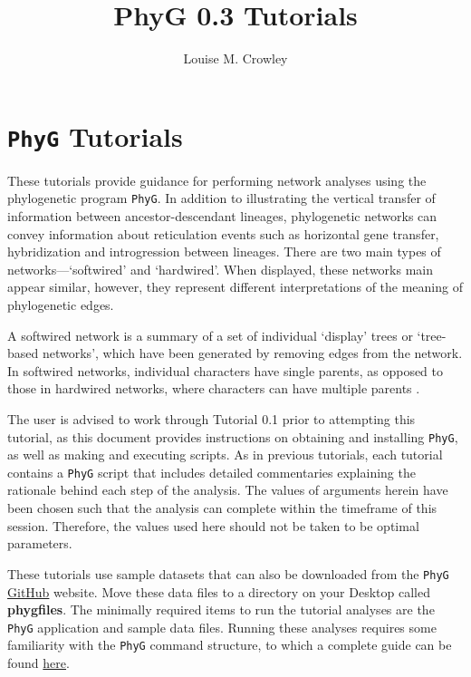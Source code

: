 \documentclass[11pt]{article}
\title{PhyG 0.3 Tutorials}
\author{Louise M. Crowley}
\newcommand{\phyg}{\texttt{PhyG} }
\begin{document}
\maketitle

\section{\phyg Tutorials}

These tutorials provide guidance for performing network analyses using the 
phylogenetic program \texttt{PhyG}. In addition to illustrating the vertical transfer 
of information between ancestor-descendant lineages, phylogenetic networks 
can convey information about reticulation events such as horizontal gene transfer, 
hybridization and introgression between lineages. There are two main types of 
networks---`softwired' and `hardwired'. When displayed, these networks main 
appear similar, however, they represent different interpretations of the meaning 
of phylogenetic edges.

A softwired network is a summary of a set of individual `display' trees or `tree-based 
networks', which have been generated by removing edges from the network.
In softwired networks, individual characters have single parents, as opposed 
to those in hardwired networks, where characters can have multiple parents 
\citep{KannanandWheeler2012}.

The user is advised to work through Tutorial 0.1 prior to attempting this tutorial, 
as this document provides instructions on obtaining and installing \texttt{PhyG}, 
as well as making and executing scripts. As in previous tutorials, each tutorial 
contains a \phyg script that includes detailed commentaries explaining the 
rationale behind each step of the analysis. The values of arguments herein have 
been chosen such that the analysis can complete within the timeframe of this 
session. Therefore, the values used here should not be taken to be optimal 
parameters. 

These tutorials use sample datasets that can also be downloaded from the 
\texttt{PhyG} \href{https://github.com/amnh/PhyGraph}{GitHub} website. Move 
these data files to a directory on your Desktop called \textbf{phygfiles}. The 
minimally required items to run the tutorial analyses are the \phyg application 
and sample data files. Running these analyses requires some familiarity with 
the \phyg command structure, to which a complete guide can be found 
\href{https://github.com/amnh/PhyGraph}{here}.
\end{document}
